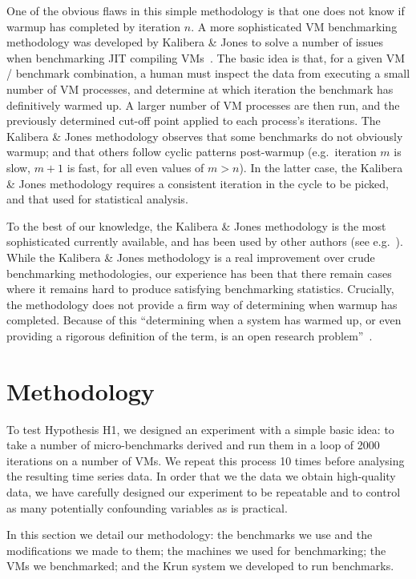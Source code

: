 \documentclass[10pt,preprint]{sigplanconf}
\newcommand{\kalibera}{Kalibera \& Jones\xspace}
\newcommand{\krun}{Krun\xspace}
\begin{document}
One of the obvious flaws in this simple methodology is that one does not know if warmup
has completed by iteration $n$. A more sophisticated VM benchmarking methodology
was developed by \kalibera to solve a number of issues when benchmarking JIT
compiling VMs~\cite{kalibera12quantifying,kalibera13rigorous}. The basic idea is
that, for a given VM / benchmark combination, a human must inspect the data from
executing a small number of VM processes, and determine at which iteration the
benchmark has definitively warmed up. A larger number of VM processes are then
run, and the previously determined cut-off point applied to each process's
iterations. The \kalibera methodology observes that some benchmarks do not
obviously warmup; and
that others follow cyclic patterns post-warmup
(e.g.~iteration $m$ is slow, $m+1$ is fast, for all even values of $m > n$). In
the latter case, the \kalibera methodology requires a consistent iteration in
the cycle to be picked, and that used for statistical analysis.

To the best of our knowledge, the \kalibera methodology is the most
sophisticated currently available, and has been used by other authors (see
e.g.~\cite{barrett15approaches,grimmer15dynamically}). While the \kalibera
methodology is a real improvement over crude benchmarking methodologies,
our experience has been that there remain cases where it remains hard to produce
satisfying benchmarking statistics. Crucially, the methodology does not
provide a firm way of determining when warmup has completed. Because of this
``determining when a system has warmed up, or even providing a
rigorous definition of the term, is an open research problem''~\cite{seaton15phd}.


\section{Methodology}
\label{sec:methodology}

To test Hypothesis H1, we designed an experiment with a simple basic idea: to
take a number of micro-benchmarks derived and
run them in a loop of 2000 iterations on a number of VMs. We repeat this
process 10 times before analysing the resulting time series data. In order
that we the data we obtain high-quality data, we have carefully designed our
experiment to be repeatable and to control as many potentially confounding variables as
is practical.

In this section we detail our methodology: the benchmarks we use and the
modifications we made to them; the machines we used for benchmarking; the VMs we
benchmarked; and the \krun system we developed to run benchmarks.
\end{document}
